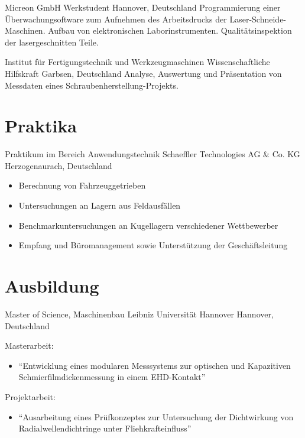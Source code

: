 \documentclass[11pt,a4paper,sans]{moderncv}
\begin{document}
{Micreon GmbH}
{Werkstudent}
{Hannover, Deutschland}
{}
{
Programmierung einer Überwachungsoftware zum Aufnehmen des Arbeitsdrucks der Laser-Schneide-Maschinen.
Aufbau von elektronischen Laborinstrumenten.
Qualitätsinspektion der lasergeschnitten Teile.
}

{Institut für Fertigungstechnik und Werkzeugmaschinen}
{Wissenschaftliche Hilfskraft}
{Garbsen, Deutschland}
{}
{
Analyse, Auswertung und Präsentation von Messdaten eines Schraubenherstellung-Projekts.
}

\section{\textbf{Praktika}}
{Praktikum im Bereich Anwendungstechnik}
{Schaeffler Technologies AG \& Co. KG}
{Herzogenaurach, Deutschland}
{}
{
    \begin{itemize}
        \item Berechnung von Fahrzeuggetrieben
        \item Untersuchungen an Lagern aus Feldausfällen
        \item Benchmarkuntersuchungen an Kugellagern verschiedener Wettbewerber
        \item Empfang und Büromanagement sowie Unterstützung der Geschäftsleitung
    \end{itemize}
}

\section{\textbf{Ausbildung}}

{Master of Science, Maschinenbau}
{Leibniz Universität Hannover}
{Hannover, Deutschland}
{}
{
    Masterarbeit:
    \begin{itemize}
        \item ``Entwicklung eines modularen Messsystems zur optischen und Kapazitiven Schmierfilmdickenmessung in einem EHD-Kontakt''
    \end{itemize}
    Projektarbeit:
    \begin{itemize}
        \item "`Ausarbeitung eines Prüfkonzeptes zur Untersuchung der Dichtwirkung von Radialwellendichtringe unter Fliehkrafteinfluss"'
    \end{itemize}
}
\end{document}
